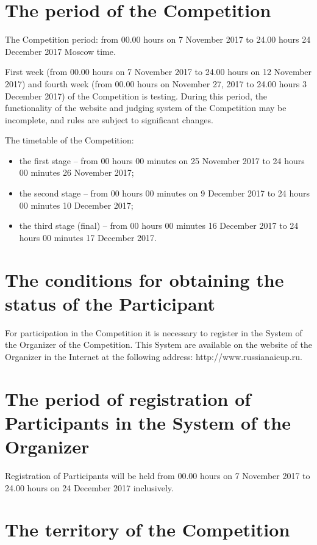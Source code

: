 \section{The period of the Competition}

The Competition period: from 00.00 hours on 7 November 2017 to 24.00 hours 24 December 2017 Moscow time.

First week (from 00.00 hours on 7 November 2017 to 24.00 hours on 12 November 2017)
and fourth week (from 00.00 hours on November 27, 2017 to 24.00 hours 3 December 2017) of the Competition is testing.
During this period, the functionality of the website and judging system of the Competition may be incomplete,
and rules are subject to significant changes.

The timetable of the Competition:
\begin{itemize}
\item the first stage – from 00 hours 00 minutes on 25 November 2017 to 24 hours 00 minutes 26 November 2017;
\item the second stage – from 00 hours 00 minutes on 9 December 2017 to 24 hours 00 minutes 10 December 2017;
\item the third stage (final) – from 00 hours 00 minutes 16 December 2017 to 24 hours 00 minutes 17 December 2017.
\end{itemize}

\section{The conditions for obtaining the status of the Participant}

For participation in the Competition it is necessary to register in the System of the Organizer of the Competition.
This System are available on the website of the Organizer in the Internet at the following address: http://www.russianaicup.ru.

\section{The period of registration of Participants in the System of the Organizer}

Registration of Participants will be held from 00.00 hours on 7 November 2017 to 24.00 hours on 24 December 2017 inclusively.

\section{The territory of the Competition}

